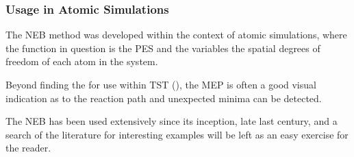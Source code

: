 \subsubsection{Usage in Atomic Simulations}
The NEB method was developed within the context of atomic simulations, where the function in question is the PES and the variables the spatial degrees of freedom of each atom in the system.

Beyond finding the  for use within TST (), the MEP is often a good visual indication as to the reaction path and unexpected minima can be detected.

The NEB has been used extensively since its inception, late last century, and a search of the literature for interesting examples will be left as an easy exercise for the reader.
